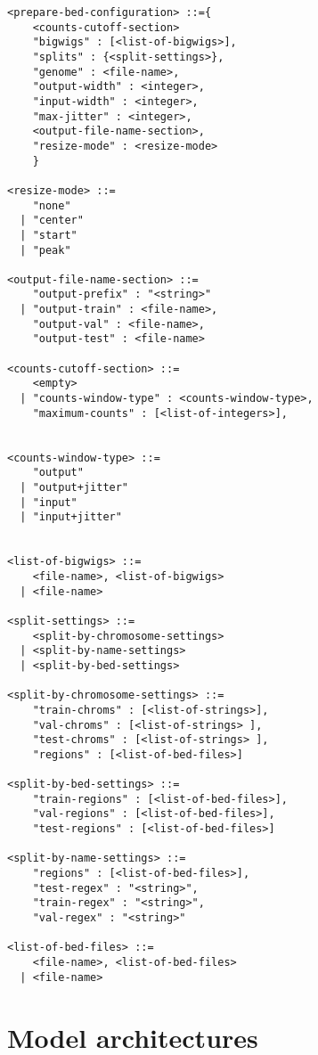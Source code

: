 \documentclass{article}
\begin{document}
\begin{lstlisting}
<prepare-bed-configuration> ::={
    <counts-cutoff-section>
    "bigwigs" : [<list-of-bigwigs>],
    "splits" : {<split-settings>},
    "genome" : <file-name>,
    "output-width" : <integer>,
    "input-width" : <integer>,
    "max-jitter" : <integer>,
    <output-file-name-section>,
    "resize-mode" : <resize-mode>
    }

<resize-mode> ::= 
    "none"
  | "center"
  | "start"
  | "peak"

<output-file-name-section> ::=
    "output-prefix" : "<string>"
  | "output-train" : <file-name>,
    "output-val" : <file-name>,
    "output-test" : <file-name>

<counts-cutoff-section> ::=
    <empty>
  | "counts-window-type" : <counts-window-type>,
    "maximum-counts" : [<list-of-integers>],


<counts-window-type> ::=
    "output"
  | "output+jitter"
  | "input" 
  | "input+jitter"


<list-of-bigwigs> ::= 
    <file-name>, <list-of-bigwigs>
  | <file-name>

<split-settings> ::=
    <split-by-chromosome-settings>
  | <split-by-name-settings>
  | <split-by-bed-settings>

<split-by-chromosome-settings> ::=
    "train-chroms" : [<list-of-strings>],
    "val-chroms" : [<list-of-strings> ],
    "test-chroms" : [<list-of-strings> ],
    "regions" : [<list-of-bed-files>]

<split-by-bed-settings> ::=
    "train-regions" : [<list-of-bed-files>],
    "val-regions" : [<list-of-bed-files>],
    "test-regions" : [<list-of-bed-files>]

<split-by-name-settings> ::=
    "regions" : [<list-of-bed-files>],
    "test-regex" : "<string>",
    "train-regex" : "<string>",
    "val-regex" : "<string>"

<list-of-bed-files> ::=
    <file-name>, <list-of-bed-files>
  | <file-name>

\end{lstlisting}

\section{Model architectures}
\end{document}
